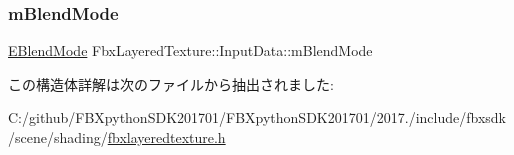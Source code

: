 \subsubsection{\texorpdfstring{m\+Blend\+Mode}{mBlendMode}}
{\footnotesize\ttfamily \hyperlink{class_fbx_layered_texture_af291d42b0329513909d2ddf48f56f5ba}{E\+Blend\+Mode} Fbx\+Layered\+Texture\+::\+Input\+Data\+::m\+Blend\+Mode}



この構造体詳解は次のファイルから抽出されました\+:\begin{DoxyCompactItemize}
\item 
C\+:/github/\+F\+B\+Xpython\+S\+D\+K201701/\+F\+B\+Xpython\+S\+D\+K201701/2017./include/fbxsdk/scene/shading/\hyperlink{fbxlayeredtexture_8h}{fbxlayeredtexture.\+h}\end{DoxyCompactItemize}
